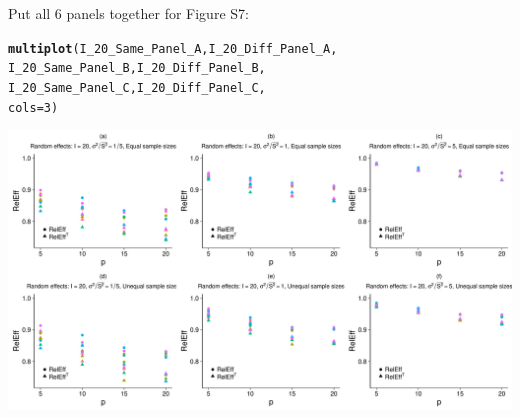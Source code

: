 \documentclass{article}\usepackage[]{graphicx}\usepackage[]{color}
\makeatletter
\def\maxwidth{ %
  \ifdim\Gin@nat@width>\linewidth
    \linewidth
  \else
    \Gin@nat@width
  \fi
}
\newcommand{\hlnum}[1]{\textcolor[rgb]{0.686,0.059,0.569}{#1}}%
\newcommand{\hlstd}[1]{\textcolor[rgb]{0.345,0.345,0.345}{#1}}%
\newcommand{\hlkwc}[1]{\textcolor[rgb]{0.333,0.667,0.333}{#1}}%
\newcommand{\hlkwd}[1]{\textcolor[rgb]{0.737,0.353,0.396}{\textbf{#1}}}%
\newenvironment{kframe}{%
 \def\at@end@of@kframe{}%
 \ifinner\ifhmode%
  \def\at@end@of@kframe{\end{minipage}}%
  \begin{minipage}{\columnwidth}%
 \fi\fi%
 \def\FrameCommand##1{\hskip\@totalleftmargin \hskip-\fboxsep
 \colorbox{shadecolor}{##1}\hskip-\fboxsep
     \hskip-\linewidth \hskip-\@totalleftmargin \hskip\columnwidth}%
 \MakeFramed {\advance\hsize-\width
   \@totalleftmargin\z@ \linewidth\hsize
   \@setminipage}}%
 {\par\unskip\endMakeFramed%
 \at@end@of@kframe}
\newenvironment{knitrout}{}{} %
\makeatother
\begin{document}
Put all 6 panels together for Figure S7:

\begin{knitrout}
\color{fgcolor}\begin{kframe}
\begin{alltt}
\hlkwd{multiplot}\hlstd{(I_20_Same_Panel_A, I_20_Diff_Panel_A,}
          \hlstd{I_20_Same_Panel_B, I_20_Diff_Panel_B,}
          \hlstd{I_20_Same_Panel_C, I_20_Diff_Panel_C,}
          \hlkwc{cols}\hlstd{=}\hlnum{3}\hlstd{)}
\end{alltt}
\end{kframe}

{\centering \includegraphics[width=\maxwidth]{figures/Figure_S7_panels-1} 

}



\end{knitrout}
\end{document}
